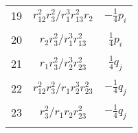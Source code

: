 \documentclass[Dissertation.tex]{subfiles}
\begin{document}
\begin{center}
\begin{longtable}{|c|c|c|}
19  & $r_{12}^2 r_3^2/r_1^3 r_{13}^2 r_2$  & $-\frac{1}{4}p_i$ \\
&  &  \\
20  & $r_2 r_3^2/r_1^3 r_{13}^2$  & $\frac{1}{4}p_i$ \\
&  &  \\
21  & $r_1 r_3^2/r_2^3 r_{23}^2$  & $\frac{1}{4}q_j$ \\
&  &  \\
22  & $r_{12}^2 r_3^2/r_1 r_2^3 r_{23}^2$  & $-\frac{1}{4}q_j$ \\
&  &  \\
23  & $r_3^2/r_1 r_2 r_{23}^2$  & $-\frac{1}{4}q_j$ \\
&  &  \\
\end{longtable}
\end{center}
\end{document}
